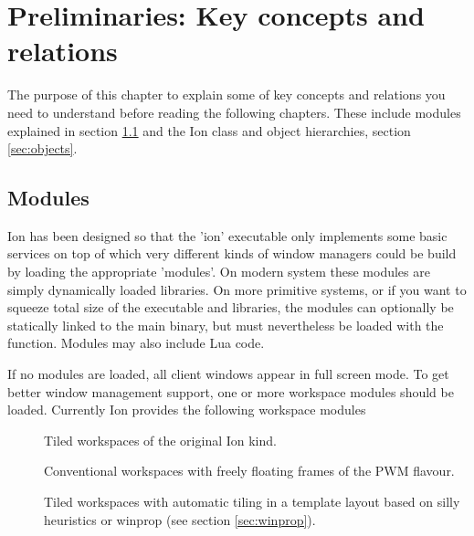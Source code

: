 
\chapter{Preliminaries: Key concepts and relations}
\label{chap:prelim}

The purpose of this chapter to explain some of key concepts and
relations you need to understand before reading the following
chapters. These include modules explained in section \ref{sec:modules}
and the Ion class and object hierarchies, section \ref{sec:objects}.


\section{Modules}
\label{sec:modules}

Ion has been designed so that the 'ion' executable only implements some
basic services on top of which very different kinds of window managers
could be build by loading the appropriate 'modules'. On modern system
these modules are simply dynamically loaded  libraries. On 
more primitive systems, or if you want to squeeze total size of the 
executable and libraries, the modules can optionally be statically 
linked to the main binary, but must nevertheless be loaded with the
 function. Modules may also include Lua code.

If no modules are loaded, all client windows appear in full screen mode.
To get better window management support, one or more workspace modules
should be loaded. Currently Ion provides the following workspace modules

\begin{description}
    \item[] Tiled workspaces of the original Ion kind.
    \item[] Conventional workspaces with freely floating
      frames of the PWM flavour.
    \item[] Tiled workspaces with automatic tiling in a
      template layout based on silly heuristics or winprop (see section
      \ref{sec:winprop}).
\end{description}

